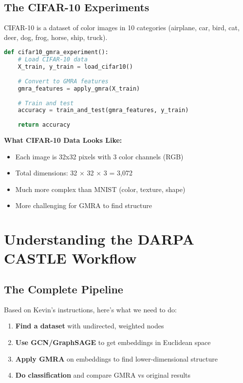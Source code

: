 \documentclass[12pt]{article}
\begin{document}
\subsection{The CIFAR-10 Experiments}

CIFAR-10 is a dataset of color images in 10 categories (airplane, car, bird, cat, deer, dog, frog, horse, ship, truck).

\begin{lstlisting}[language=Python, basicstyle=\small]
def cifar10_gmra_experiment():
    # Load CIFAR-10 data
    X_train, y_train = load_cifar10()
    
    # Convert to GMRA features
    gmra_features = apply_gmra(X_train)
    
    # Train and test
    accuracy = train_and_test(gmra_features, y_train)
    
    return accuracy
\end{lstlisting}

\textbf{What CIFAR-10 Data Looks Like:}
\begin{itemize}
    \item Each image is 32x32 pixels with 3 color channels (RGB)
    \item Total dimensions: 32 × 32 × 3 = 3,072
    \item Much more complex than MNIST (color, texture, shape)
    \item More challenging for GMRA to find structure
\end{itemize}

\section{Understanding the DARPA CASTLE Workflow}

\subsection{The Complete Pipeline}

Based on Kevin's instructions, here's what we need to do:

\begin{enumerate}
    \item \textbf{Find a dataset} with undirected, weighted nodes
    \item \textbf{Use GCN/GraphSAGE} to get embeddings in Euclidean space
    \item \textbf{Apply GMRA} on embeddings to find lower-dimensional structure
    \item \textbf{Do classification} and compare GMRA vs original results
\end{enumerate}
\end{document}
